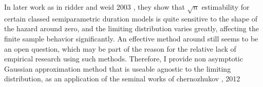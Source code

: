 \documentclass[uplatex,dvipdfmx]{jsarticle}
\begin{document}
In later work as in %
{ridder and weid 2003} , they show that $\sqrt{n} $ estimability for certain classed semiparametric duration models is quite sensitive to the shape of the hazard around zero, and the limiting distribution varies greatly, affecting the finite sample behavior significantly. An effective method around still seems to be an open question, which may be part of the reason for the relative lack of empirical research using such methods. Therefore, I provide non asymptotic Gaussian approximation method that is useable agnostic to the limiting distribution, as an application of the seminal works of %
{chernozhukov , 2012}




\end{document}
